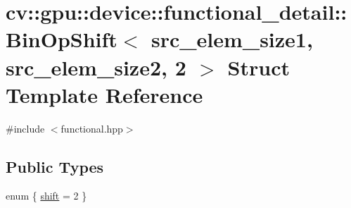 \hypertarget{structcv_1_1gpu_1_1device_1_1functional__detail_1_1BinOpShift_3_01src__elem__size1_00_01src__elem__size2_00_012_01_4}{\section{cv\-:\-:gpu\-:\-:device\-:\-:functional\-\_\-detail\-:\-:Bin\-Op\-Shift$<$ src\-\_\-elem\-\_\-size1, src\-\_\-elem\-\_\-size2, 2 $>$ Struct Template Reference}
\label{structcv_1_1gpu_1_1device_1_1functional__detail_1_1BinOpShift_3_01src__elem__size1_00_01src__elem__size2_00_012_01_4}
}


{\ttfamily \#include $<$functional.\-hpp$>$}

\subsection*{Public Types}
\begin{DoxyCompactItemize}
\item 
enum \{ \hyperlink{structcv_1_1gpu_1_1device_1_1functional__detail_1_1BinOpShift_3_01src__elem__size1_00_01src__elem__size2_00_012_01_4_a9a82d882fc6060bdd91ca8069ebc65b7a4d62aea00e941a71ca83c46b4e608d37}{shift} = 2
 \}
\end{DoxyCompactItemize}


